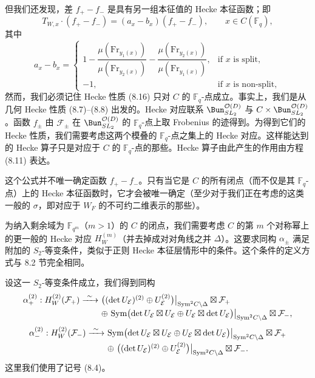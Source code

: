 但我们还发现，差 $f_+ - f_-$ 是具有另一组本征值的 Hecke 本征函数；即
\begin{equation}\tag{8.16}
T_{W,x}\cdot (f_+ - f_-) = (a_x - b_x)(f_+ - f_-), \qquad x\in C(\mathbb{F}_q),
\end{equation}
其中
\begin{equation}\tag{8.17}
a_x - b_x = \begin{cases} 1 - \dfrac{\mu(\mathrm{Fr}_{y_1(x)})}{\mu(\mathrm{Fr}_{y_2(x)})} - \dfrac{\mu(\mathrm{Fr}_{y_2(x)})}{\mu(\mathrm{Fr}_{y_1(x)})}, & \text{if } x \text{ is split},\\[10pt] -1, & \text{if } x \text{ is non-split},\end{cases}
\end{equation}
然而，我们必须记住 Hecke 性质 (8.16) 只对 $C$ 的 $\mathbb{F}_q$-点成立。事实上，我们是从几何 Hecke 性质 (8.7)--(8.8) 出发的。Hecke 对应联系 $\Bun^{\mathcal{O}(D)}_{SL_2}$ 与 $C\times \Bun^{\mathcal{O}(D)}_{SL_2}$。函数 $f_\pm$ 由 $\mathcal{F}_\pm$ 在 $\Bun^{\mathcal{O}(D)}_{SL_2}$ 的 $\mathbb{F}_q$-点上取 Frobenius 的迹得到。为得到它们的 Hecke 性质，我们需要考虑这两个模叠的 $\mathbb{F}_q$-点之集上的 Hecke 对应。这样能达到的 Hecke 算子只是对应于 $C$ 的 $\mathbb{F}_q$-点的那些。Hecke 算子由此产生的作用由方程 (8.11) 表达。

这个公式并不唯一确定函数 $f_+ - f_-$。只有当它是 $C$ 的所有闭点（而不仅是其 $\mathbb{F}_q$-点）上的 Hecke 本征函数时，它才会被唯一确定（至少对于我们正在考虑的这类一般的 $\sigma$，即对应于 $W_F$ 的不可约二维表示的那些）。

为纳入剩余域为 $\mathbb{F}_{q^m}$（$m > 1$）的 $C$ 的闭点，我们需要考虑 $C$ 的第 $m$ 个对称幂上的更一般的 Hecke 对应 $H_W^{(m)}$（并去掉成对对角线之并 $\Delta$）。这要求同构 $\alpha_\pm$ 满足附加的 $S_2$-等变条件，类似于正则 Hecke 本征层情形中的条件。这个条件的定义方式与 8.2 节完全相同。

设这一 $S_2$-等变条件成立，我们得到同构
\[
\begin{array}{r@{\ }l}
\alpha_+^{(2)} : H_W^{(2)}(\mathcal{F}_+) \xrightarrow{\ \sim\ } & \bigl((\det U_{\mathcal{E}})^{(2)}\oplus U_{\mathcal{E}}^{(2)}\bigr)\big|_{\mathrm{Sym}^2 C\setminus\Delta}\boxtimes \mathcal{F}_+\\[4pt]
& \oplus\ \mathrm{Sym}\bigl(\det U_{\mathcal{E}}\boxtimes U_{\mathcal{E}}\oplus U_{\mathcal{E}}\boxtimes \det U_{\mathcal{E}}\bigr)\big|_{\mathrm{Sym}^2 C\setminus\Delta}\boxtimes \mathcal{F}_-,
\end{array}
\]
\[
\begin{array}{r@{\ }l}
\alpha_-^{(2)} : H_W^{(2)}(\mathcal{F}_-) \xrightarrow{\ \sim\ } & \mathrm{Sym}\bigl(\det U_{\mathcal{E}}\boxtimes U_{\mathcal{E}}\oplus U_{\mathcal{E}}\boxtimes \det U_{\mathcal{E}}\bigr)\big|_{\mathrm{Sym}^2 C\setminus\Delta}\boxtimes \mathcal{F}_+\\[4pt]
& \oplus\ \bigl((\det U_{\mathcal{E}})^{(2)}\oplus U_{\mathcal{E}}^{(2)}\bigr)\big|_{\mathrm{Sym}^2 C\setminus\Delta}\boxtimes \mathcal{F}_-.
\end{array}
\]
这里我们使用了记号 (8.4)。

